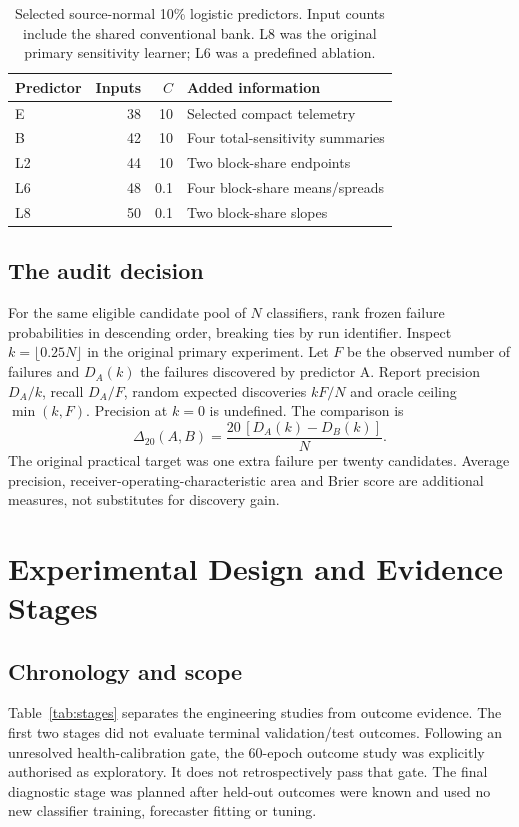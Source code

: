 \documentclass[nolineno]{ieeeaccess}
\newcommand{\Dtwenty}{\Delta_{20}}
\begin{document}
\begin{table}[t]
\caption{Selected source-normal 10\% logistic predictors. Input counts include the shared conventional bank. L8 was the original primary sensitivity learner; L6 was a predefined ablation.}
\label{tab:learners}
\centering\small
\begin{tabular}{lrr>{\raggedright\arraybackslash}p{3.4cm}}
\toprule Predictor & Inputs & $C$ & Added information\\\midrule
E &38&10&Selected compact telemetry\\
B &42&10&Four total-sensitivity summaries\\
L2&44&10&Two block-share endpoints\\
L6&48&0.1&Four block-share means/spreads\\
L8&50&0.1&Two block-share slopes\\\bottomrule
\end{tabular}
\end{table}

\subsection{The audit decision}
For the same eligible candidate pool of $N$ classifiers, rank frozen failure probabilities in descending order, breaking ties by run identifier. Inspect $k=\lfloor0.25N\rfloor$ in the original primary experiment. Let $F$ be the observed number of failures and $D_A(k)$ the failures discovered by predictor A. Report precision $D_A/k$, recall $D_A/F$, random expected discoveries $kF/N$ and oracle ceiling $\min(k,F)$. Precision at $k=0$ is undefined. The comparison is
\begin{equation}
\Dtwenty(A,B)=\frac{20\,[D_A(k)-D_B(k)]}{N}.
\label{eq:gain}
\end{equation}
The original practical target was one extra failure per twenty candidates. Average precision, receiver-operating-characteristic area and Brier score are additional measures, not substitutes for discovery gain.

\section{Experimental Design and Evidence Stages}
\label{sec:experiments}
\subsection{Chronology and scope}
Table~\ref{tab:stages} separates the engineering studies from outcome evidence. The first two stages did not evaluate terminal validation/test outcomes. Following an unresolved health-calibration gate, the 60-epoch outcome study was explicitly authorised as exploratory. It does not retrospectively pass that gate. The final diagnostic stage was planned after held-out outcomes were known and used no new classifier training, forecaster fitting or tuning.
\end{document}
